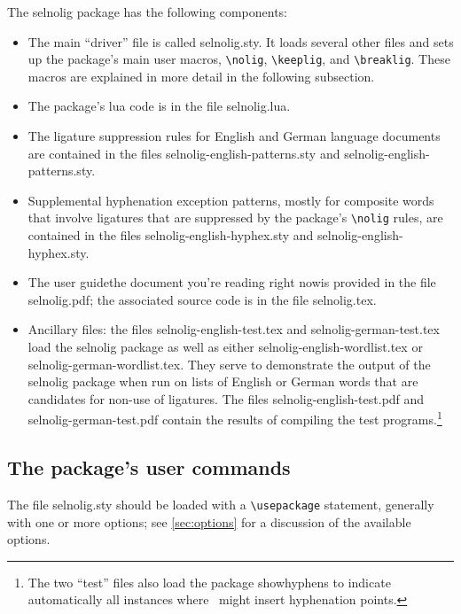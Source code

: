 \documentclass[11pt]{article}
\newcommand{\pkg}[1]{\textsf{#1}}
\newcommand{\cmmd}[1]{\texttt{\textbackslash #1}}
\begin{document}
The \pkg{selnolig} package has the following components:
\begin{itemize}
\item The main \enquote{driver} file is called \pkg{selnolig.sty}. It loads several other files and sets up the package's main user macros, \cmmd{nolig}, \cmmd{keeplig}, and \cmmd{breaklig}. These macros are explained in more detail in the following subsection.
\item The package's lua code is in the file \pkg{selnolig.lua}. 
\item The ligature suppression rules for English and German language documents are contained in the files \pkg{selnolig-english-patterns.sty} and \pkg{selnolig-english-patterns.sty}. 
\item Supplemental hyphenation exception patterns, mostly for composite words that involve ligatures that are  suppressed by the package's \cmmd{nolig} rules, are contained in the files \pkg{selnolig-english-hyphex.sty} and \pkg{selnolig-english-hyphex.sty}.
\item The user guide\textemdash the document you're reading right now\textemdash is provided in the file \pkg{selnolig.pdf}; the associated source code is in the file \pkg{selnolig.tex}. 
\item Ancillary files: the files \pkg{selnolig-english-test.tex} and \pkg{selnolig-german-test.tex} load the \pkg{selnolig} package as well as either \pkg{selnolig-english-wordlist.tex} or \pkg{selnolig-german-wordlist.tex}. They serve to demonstrate the output of the \pkg{selnolig} package when run on lists of English or German words that are candidates for non-use of ligatures. The files \pkg{selnolig-english-test.pdf} and \pkg{selnolig-german-test.pdf} contain the results of compiling the test programs.\footnote{The two \enquote{test} files also load the package \pkg{showhyphens} to indicate automatically all instances where \LuaLaTeX\ might insert hyphenation points.}

\end{itemize}


\subsection{The package's user commands} \label{sec:syntax}

The file \pkg{selnolig.sty} should be loaded with a \cmmd{usepackage} statement, generally with one or more options; see \cref{sec:options} for a discussion of the available options. 
\end{document}
